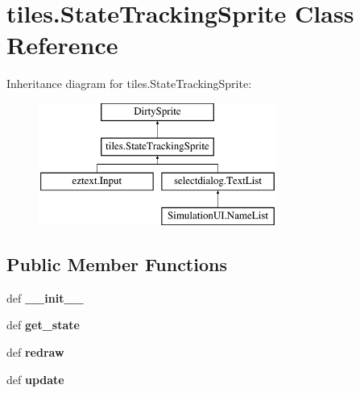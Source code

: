 \hypertarget{classtiles_1_1StateTrackingSprite}{\section{tiles.\-State\-Tracking\-Sprite Class Reference}
\label{classtiles_1_1StateTrackingSprite}
}
Inheritance diagram for tiles.\-State\-Tracking\-Sprite\-:\begin{figure}[H]
\begin{center}
\leavevmode
\includegraphics[height=4.000000cm]{classtiles_1_1StateTrackingSprite}
\end{center}
\end{figure}
\subsection*{Public Member Functions}
\begin{DoxyCompactItemize}
\item 
\hypertarget{classtiles_1_1StateTrackingSprite_a8ba9bb3952a9fbbc4d84bdc79c792eab}{def {\bfseries \-\_\-\-\_\-init\-\_\-\-\_\-}}\label{classtiles_1_1StateTrackingSprite_a8ba9bb3952a9fbbc4d84bdc79c792eab}

\item 
\hypertarget{classtiles_1_1StateTrackingSprite_ab53468b1c606fe0f513a1fb7cf446c63}{def {\bfseries get\-\_\-state}}\label{classtiles_1_1StateTrackingSprite_ab53468b1c606fe0f513a1fb7cf446c63}

\item 
\hypertarget{classtiles_1_1StateTrackingSprite_ad85028bf7b40f8dbd1b5e2d24185acf2}{def {\bfseries redraw}}\label{classtiles_1_1StateTrackingSprite_ad85028bf7b40f8dbd1b5e2d24185acf2}

\item 
\hypertarget{classtiles_1_1StateTrackingSprite_a72e277ca649b0f2646380ab3c8606efc}{def {\bfseries update}}\label{classtiles_1_1StateTrackingSprite_a72e277ca649b0f2646380ab3c8606efc}

\end{DoxyCompactItemize}
